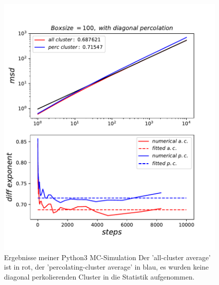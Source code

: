 \documentclass[a4paper, 12pt]{report}
\begin{document}
\begin{figure}[h!]
	\centering
	\includegraphics[scale=0.9]{newacpc100.pdf}
	\caption{Ergebnisse meiner Python3 MC-Simulation \break Der 'all-cluster average' ist in rot, der 'percolating-cluster average' in blau, es wurden keine diagonal perkolierenden Cluster in die Statistik aufgenommen.}
\end{figure}
\newpage
\end{document}
